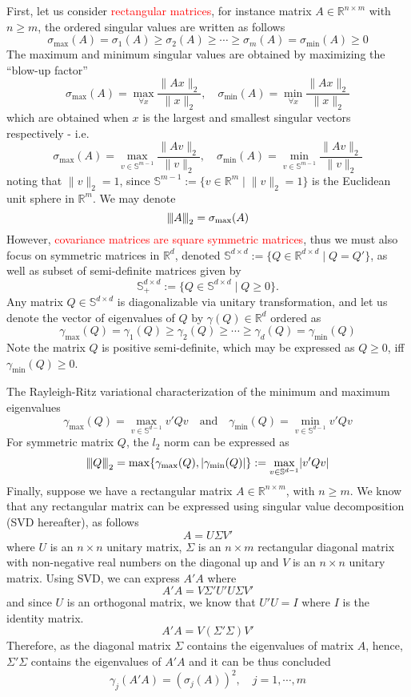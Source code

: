 \documentclass[10pt,handout,english]{beamer}
\newcommand{\R}{\mathbb{R}}
\renewcommand{\S}{\mathbb{S}}
\newcommand{\vertiii}[1]{{\left\vert\kern-0.25ex\left\vert\kern-0.25ex\left\vert #1 
    \right\vert\kern-0.25ex\right\vert\kern-0.25ex\right\vert}}
\begin{document}
\begin{frame}[allowframebreaks]
First, let us consider \textcolor{red}{rectangular matrices}, for instance matrix $A\in\R^{n\times m}$ with $n\geq m$, the ordered singular values are written as follows
\[
\sigma_{\max}(A)=\sigma_1(A)\geq\sigma_{2}(A)\geq\cdots\geq\sigma_m(A)=\sigma_{\min}(A)\geq 0
\]
The maximum and minimum singular values are obtained by maximizing the \textquotedblleft blow-up factor\textquotedblright
\[
\sigma_{\max}(A)=\max_{\forall x}\frac{\lVert Ax \rVert_2}{\lVert x\rVert_2},\quad \sigma_{\min}(A)=\min_{\forall x}\frac{\lVert Ax \rVert_2}{\lVert x\rVert_2}
\]
which are obtained when $x$ is the largest and smallest singular vectors respectively - i.e.
\[
\sigma_{\max}(A)=\max_{v\in \S^{m-1}}\frac{\lVert Av \rVert_2}{\lVert v\rVert_2},\quad \sigma_{\min}(A)=\min_{v\in \S^{m-1}}\frac{\lVert Av \rVert_2}{\lVert v\rVert_2}
\]
noting that $\lVert v\rVert_2=1$, since $\S^{m-1}:=\{v\in\R^m\mid \lVert v\rVert_2=1\}$ is the Euclidean unit sphere in $\R^m$. We may denote
\[
\vertiii{A}_2=\sigma_{\max}(A)
\]
However, \textcolor{red}{covariance matrices are square symmetric matrices}, thus we must also focus on symmetric matrices in $\R^d$, denoted $\S^{d\times d}:=\{Q\in\R^{d\times d}\mid Q=Q'\}$, as well as subset of semi-definite matrices given by
\[
\S_{+}^{d\times d}:=\{Q\in \S^{d\times d}\mid Q\geq 0\}.
\]
Any matrix $Q\in \S^{d\times d}$ is diagonalizable via unitary transformation, and let us denote the vector of eigenvalues of $Q$ by $\gamma(Q)\in\R^d$ ordered as 
\[
\gamma_{\max}(Q)=\gamma_1(Q)\geq \gamma_2(Q) \geq\cdots\geq\gamma_d(Q)=\gamma_{\min}(Q)
\]
Note the matrix $Q$ is positive semi-definite, which may be expressed as $Q\geq 0$, iff $\gamma_{\min}(Q)\geq 0$.

The Rayleigh-Ritz variational characterization of the minimum and maximum eigenvalues 
\[
\gamma_{\max}(Q)=\max_{v\in \S^{d-1}}v'Qv\quad\text{and}\quad\gamma_{\min}(Q)=\min_{v\in \S^{d-1}}v'Qv
\]
For symmetric matrix $Q$, the $l_2$ norm can be expressed as 
\[
\vertiii{Q}_2=\max\{\gamma_{\max}(Q), \lvert\gamma_{\min}(Q)\rvert\}:=\max_{v\in \S^{d-1}}\lvert v'Qv\rvert
\]
Finally, suppose we have a rectangular matrix $A\in\R^{n\times m}$, with $n\geq m$. We know that any rectangular matrix can be expressed using singular value decomposition (SVD hereafter), as follows 
\[
A=U\Sigma V'
\]
where $U$ is an $n\times n$ unitary matrix, $\Sigma$ is an $n\times m$ rectangular diagonal matrix with non-negative real numbers on the diagonal up and $V$ is an $n\times n$ unitary matrix. Using SVD, we can express $A'A$ where
\[
A'A=V\Sigma' U'U\Sigma V'
\]
and since $U$ is an orthogonal matrix, we know that $U'U=I$ where $I$ is the identity matrix.
\[
A'A=V(\Sigma'\Sigma) V'
\]
Therefore, as the diagonal matrix $\Sigma$ contains the eigenvalues of matrix $A$, hence, $\Sigma'\Sigma$ contains the eigenvalues of $A'A$ and it can be thus concluded
\[
\gamma_j(A'A)=(\sigma_j(A))^2,\quad j=1,\cdots,m
\]
\end{frame}
\end{document}
